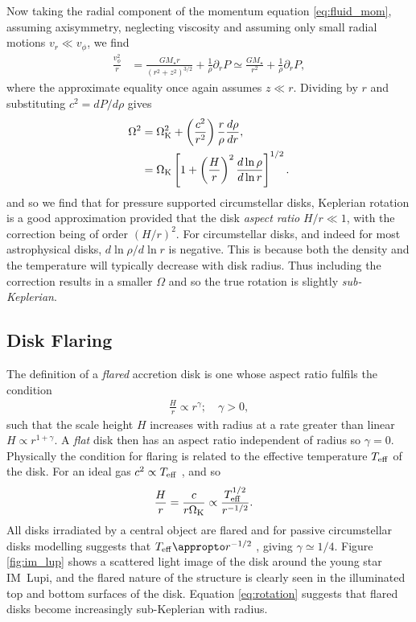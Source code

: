 Now taking the radial component of the momentum equation \ref{eq:fluid_mom}, assuming axisymmetry, neglecting viscosity and assuming only small radial motions $v_r \ll v_\phi$, we find
\begin{align}
    \frac{v_\phi^2}{r} &= \frac{G M_\star r}{\left( r^2 + z^2  \right)^{3/2}} + \frac{1}{\rho} \partial_r P \simeq \frac{G M_\star}{ r^2} + \frac{1}{\rho} \partial_r P, \label{eq:rot_eq_full}
\end{align}
where the approximate equality once again assumes $z \ll r$.
Dividing by $r$ and substituting $c^2=dP/d\rho$ gives
\begin{align}
    \Omega^2 &= \Omega_{\rm K}^2 + \left( \frac{c^2}{r^2} \right) \frac{r}{\rho} \frac{d \rho}{dr}, \\
    &= \Omega_{\rm K} \left[ 1 + \left(\frac{H}{r}\right)^2 \frac{d \ln{\rho}}{d \ln{r}} \right]^{1/2} . \label{eq:rotation}
\end{align}
and so we find that for pressure supported circumstellar disks, Keplerian rotation is a good approximation provided that the disk \textit{aspect ratio} $H/r \ll 1$, with the correction being of order $(H/r)^2$.
For circumstellar disks, and indeed for most astrophysical disks, $d\ln{\rho}/d\ln{r}$ is negative.
This is because both the density and the temperature will typically decrease with disk radius.
Thus including the correction results in a smaller $\Omega$ and so the true rotation is slightly \textit{sub-Keplerian}.

\subsection{Disk Flaring} \label{sec:disk_flaring}

The definition of a \textit{flared} accretion disk is one whose aspect ratio fulfils the condition
\begin{align}
    \frac{H}{r} \propto r^\gamma; \quad \gamma > 0, \label{eq:flared_hr}
\end{align}
such that the scale height $H$ increases with radius at a rate greater than linear $H \propto r^{1+\gamma}$. 
A \textit{flat} disk then has an aspect ratio independent of radius so 
$\gamma=0$.
Physically the condition for flaring is related to the effective temperature $T_{\rm eff}$ of the disk.
For an ideal gas $c^2 \propto T_{\rm eff}$ \citep[e.g.][]{pringle2007}, and so
\begin{align}
    \frac{H}{r} &= \frac{c}{r \Omega_{\rm K}} \propto \frac{T_{\rm eff}^{1/2}}{r^{-1/2}}.
\end{align}
All disks irradiated by a central object are flared \citep{kenyon1987} and for passive circumstellar disks modelling suggests that $T_{\rm eff} \appropto r^{-1/2}$ \citep{chiang1997}, giving $\gamma \simeq 1/4$.
Figure \ref{fig:im_lup} shows a scattered light image of the disk around the young star IM~Lupi, and the flared nature of the structure is clearly seen in the illuminated top and bottom surfaces of the disk.
Equation \ref{eq:rotation} suggests that flared disks become increasingly sub-Keplerian with radius.

